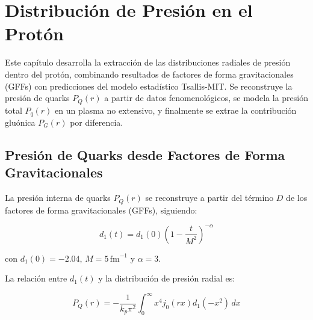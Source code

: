 \chapter{Distribuci\'on de Presi\'on en el Prot\'on}\label{ch:TotalPandGluons}

\fancyhf{} %

\begin{chaptersummary}
Este cap\'itulo desarrolla la extracci\'on de las distribuciones radiales de presi\'on dentro del prot\'on, combinando resultados de factores de forma gravitacionales (GFFs) con predicciones del modelo estad\'istico Tsallis-MIT. Se reconstruye la presi\'on de quarks $P_Q(r)$ a partir de datos fenomenol\'ogicos, se modela la presi\'on total $P_q(r)$ en un plasma no extensivo, y finalmente se extrae la contribuci\'on glu\'onica $P_G(r)$ por diferencia.
\end{chaptersummary}

\section{Presi\'on de Quarks desde Factores de Forma Gravitacionales}
La presi\'on interna de quarks $P_Q(r)$ se reconstruye a partir del t\'ermino $D$ de los factores de forma gravitacionales (GFFs), siguiendo:

\begin{equation}
d_1(t) = d_1(0) \left( 1 - \frac{t}{M^2} \right)^{-\alpha}
\end{equation}

con $d_1(0) = -2.04$, $M = 5\,\mathrm{fm}^{-1}$ y $\alpha = 3$.

La relaci\'on entre $d_1(t)$ y la distribuci\'on de presi\'on radial es:

\begin{equation}
P_Q(r) = -\frac{1}{k_p \pi^2} \int_0^\infty x^4 j_0(r x) d_1(-x^2) \, dx
\end{equation}

